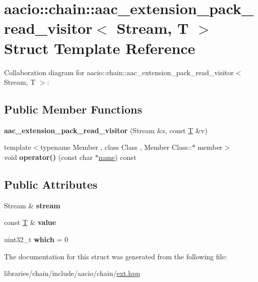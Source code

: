 \hypertarget{structaacio_1_1chain_1_1aac__extension__pack__read__visitor}{}\section{aacio\+:\+:chain\+:\+:aac\+\_\+extension\+\_\+pack\+\_\+read\+\_\+visitor$<$ Stream, T $>$ Struct Template Reference}
\label{structaacio_1_1chain_1_1aac__extension__pack__read__visitor}


Collaboration diagram for aacio\+:\+:chain\+:\+:aac\+\_\+extension\+\_\+pack\+\_\+read\+\_\+visitor$<$ Stream, T $>$\+:
\subsection*{Public Member Functions}
\begin{DoxyCompactItemize}
\item 
\mbox{\label{structaacio_1_1chain_1_1aac__extension__pack__read__visitor_aa36e79634f524a4890c20fe574f2ac6b}} 
{\bfseries aac\+\_\+extension\+\_\+pack\+\_\+read\+\_\+visitor} (Stream \&s, const \mbox{\hyperlink{struct_t}{T}} \&v)
\item 
\mbox{\label{structaacio_1_1chain_1_1aac__extension__pack__read__visitor_a6ec6450ae1aa8671324e034227b7bd51}} 
{\footnotesize template$<$typename Member , class Class , Member Class\+::$\ast$ member$>$ }\\void {\bfseries operator()} (const char $\ast$\mbox{\hyperlink{structaacio_1_1chain_1_1name}{name}}) const
\end{DoxyCompactItemize}
\subsection*{Public Attributes}
\begin{DoxyCompactItemize}
\item 
\mbox{\label{structaacio_1_1chain_1_1aac__extension__pack__read__visitor_ac9156f4d88b222266ad3ba4921e4bb93}} 
Stream \& {\bfseries stream}
\item 
\mbox{\label{structaacio_1_1chain_1_1aac__extension__pack__read__visitor_aa79bdbae29ec4d35e1fb5ebc4ddd4abb}} 
const \mbox{\hyperlink{struct_t}{T}} \& {\bfseries value}
\item 
\mbox{\label{structaacio_1_1chain_1_1aac__extension__pack__read__visitor_aafa4560f0f122ed66a055dfc534b5648}} 
uint32\+\_\+t {\bfseries which} = 0
\end{DoxyCompactItemize}


The documentation for this struct was generated from the following file\+:\begin{DoxyCompactItemize}
\item 
libraries/chain/include/aacio/chain/\mbox{\hyperlink{ext_8hpp}{ext.\+hpp}}\end{DoxyCompactItemize}
